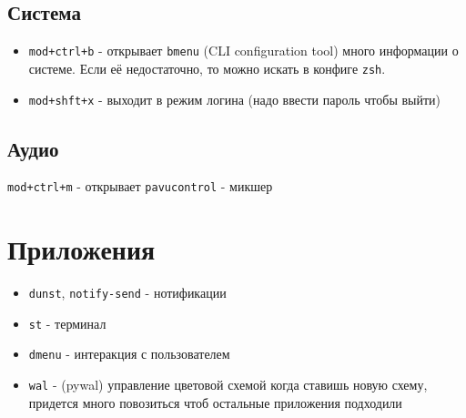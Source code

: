 \documentclass{article}
\begin{document}
\subsection{Система}
\begin{itemize}
    \item \verb|mod+ctrl+b| - открывает \verb|bmenu| (CLI configuration tool)
много информации о системе.  Если её недостаточно, то можно искать
в конфиге \verb|zsh|.
    \item \verb|mod+shft+x| - выходит в режим логина (надо ввести пароль
        чтобы выйти)
\end{itemize}

\subsection{Аудио}
\verb|mod+ctrl+m| - открывает \verb|pavucontrol| - микшер

\section{Приложения}
\begin{itemize}
    \item \verb|dunst|, \verb|notify-send| - нотификации
    \item \verb|st| - терминал
    \item \verb|dmenu| - интеракция с пользователем
    \item \verb|wal| - (pywal) управление цветовой схемой
        \subitem когда ставишь новую схему, придется много повозиться
        чтоб остальные приложения подходили
\end{itemize}
\end{document}
